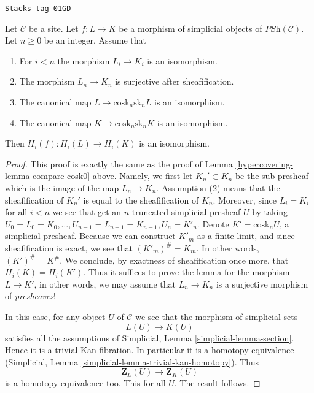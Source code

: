 \begin{lemma}[Acyclicity]
\label{hypercovering-lemma-acyclicity}
\href{https://stacks.math.columbia.edu/tag/01GD}{\texttt{Stacks tag 01GD}}

Let $\mathcal{C}$ be a site.
Let $f : L \to K$ be a morphism of
simplicial objects of $\textit{PSh}(\mathcal{C})$.
Let $n \geq 0$ be an integer.
Assume that
\begin{enumerate}
\item For $i < n$ the morphism $L_i \to K_i$ is an isomorphism.
\item The morphism $L_n \to K_n$ is surjective after sheafification.
\item The canonical map $L \to \text{cosk}_n \text{sk}_n L$ is an isomorphism.
\item The canonical map $K \to \text{cosk}_n \text{sk}_n K$ is an isomorphism.
\end{enumerate}
Then $H_i(f) : H_i(L) \to H_i(K)$ is an isomorphism.
\end{lemma}

\begin{proof}

This proof is exactly the same as the proof of
Lemma \ref{hypercovering-lemma-compare-cosk0} above. Namely,
we first let $K_n' \subset K_n$ be the sub presheaf
which is the image of the map $L_n \to K_n$. Assumption
(2) means that the sheafification of $K_n'$ is equal to
the sheafification of $K_n$. Moreover, since $L_i = K_i$
for all $i < n$ we see that get an $n$-truncated
simplicial presheaf $U$ by taking
$U_0 = L_0 = K_0, \ldots, U_{n - 1} = L_{n - 1} = K_{n - 1}, U_n = K'_n$.
Denote $K' = \text{cosk}_n U$, a simplicial presheaf.
Because we can construct $K'_m$ as a finite limit, and
since sheafification is exact, we see that
$(K'_m)^\# = K_m$. In other words, $(K')^\# = K^\#$.
We conclude, by exactness of sheafification once more,
that $H_i(K) = H_i(K')$. Thus it suffices to prove the lemma
for the morphism $L \to K'$, in other words, we may
assume that $L_n \to K_n$ is a surjective morphism
of {\it presheaves}!

\medskip\noindent
In this case, for any object $U$ of $\mathcal{C}$ we
see that the morphism of simplicial sets
$$
L(U) \longrightarrow K(U)
$$
satisfies all the assumptions of
Simplicial, Lemma \ref{simplicial-lemma-section}.
Hence it is a trivial Kan fibration. In particular it is
a homotopy equivalence
(Simplicial, Lemma \ref{simplicial-lemma-trivial-kan-homotopy}).
Thus
$$
\mathbf{Z}_L(U) \longrightarrow \mathbf{Z}_K(U)
$$
is a homotopy equivalence too. This for all $U$.
The result follows.
\end{proof}

